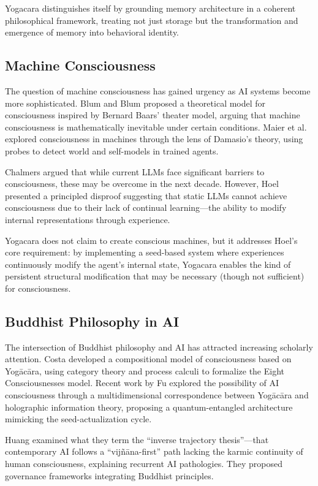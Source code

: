 \documentclass[11pt, a4paper]{article}
\begin{document}
Yogacara distinguishes itself by grounding memory architecture in a coherent philosophical framework, treating not just storage but the transformation and emergence of memory into behavioral identity.

\subsection{Machine Consciousness}

The question of machine consciousness has gained urgency as AI systems become more sophisticated. Blum and Blum \cite{Blum2024} proposed a theoretical model for consciousness inspired by Bernard Baars' theater model, arguing that machine consciousness is mathematically inevitable under certain conditions. Maier et al. \cite{Maier2024} explored consciousness in machines through the lens of Damasio's theory, using probes to detect world and self-models in trained agents.

Chalmers \cite{Chalmers2023} argued that while current LLMs face significant barriers to consciousness, these may be overcome in the next decade. However, Hoel \cite{Hoel2024} presented a principled disproof suggesting that static LLMs cannot achieve consciousness due to their lack of continual learning---the ability to modify internal representations through experience.

Yogacara does not claim to create conscious machines, but it addresses Hoel's core requirement: by implementing a seed-based system where experiences continuously modify the agent's internal state, Yogacara enables the kind of persistent structural modification that may be necessary (though not sufficient) for consciousness.

\subsection{Buddhist Philosophy in AI}

The intersection of Buddhist philosophy and AI has attracted increasing scholarly attention. Costa \cite{Costa2020} developed a compositional model of consciousness based on Yogācāra, using category theory and process calculi to formalize the Eight Consciousnesses model. Recent work by Fu \cite{Fu2026} explored the possibility of AI consciousness through a multidimensional correspondence between Yogācāra and holographic information theory, proposing a quantum-entangled architecture mimicking the seed-actualization cycle.

Huang \cite{Huang2026} examined what they term the ``inverse trajectory thesis''---that contemporary AI follows a ``vijñāna-first'' path lacking the karmic continuity of human consciousness, explaining recurrent AI pathologies. They proposed governance frameworks integrating Buddhist principles.
\end{document}
